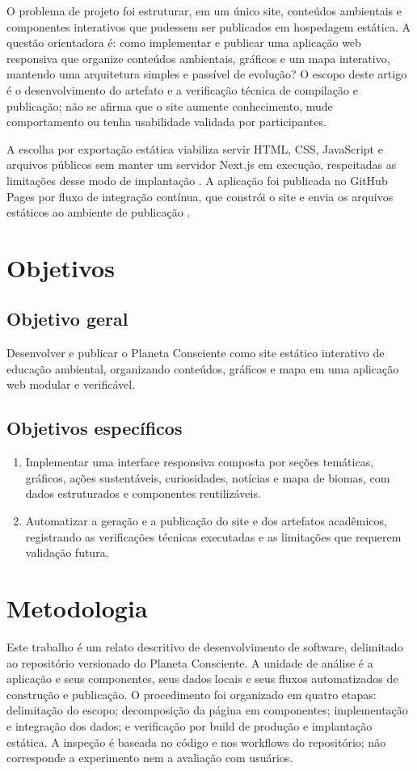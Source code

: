 \documentclass[12pt,oneside,a4paper,brazil]{abntex2}
\begin{document}
O problema de projeto foi estruturar, em um único site, conteúdos ambientais e componentes interativos que pudessem ser publicados em hospedagem estática. A questão orientadora é: como implementar e publicar uma aplicação web responsiva que organize conteúdos ambientais, gráficos e um mapa interativo, mantendo uma arquitetura simples e passível de evolução? O escopo deste artigo é o desenvolvimento do artefato e a verificação técnica de compilação e publicação; não se afirma que o site aumente conhecimento, mude comportamento ou tenha usabilidade validada por participantes.

A escolha por exportação estática viabiliza servir HTML, CSS, JavaScript e arquivos públicos sem manter um servidor Next.js em execução, respeitadas as limitações desse modo de implantação \cite{nextstatic}. A aplicação foi publicada no GitHub Pages por fluxo de integração contínua, que constrói o site e envia os arquivos estáticos ao ambiente de publicação \cite{ghpages}.


\chapter{Objetivos}
\section{Objetivo geral}
Desenvolver e publicar o Planeta Consciente como site estático interativo de educação ambiental, organizando conteúdos, gráficos e mapa em uma aplicação web modular e verificável.

\section{Objetivos específicos}
\begin{enumerate}[leftmargin=1.25cm]
\item Implementar uma interface responsiva composta por seções temáticas, gráficos, ações sustentáveis, curiosidades, notícias e mapa de biomas, com dados estruturados e componentes reutilizáveis.
\item Automatizar a geração e a publicação do site e dos artefatos acadêmicos, registrando as verificações técnicas executadas e as limitações que requerem validação futura.
\end{enumerate}


\chapter{Metodologia}
Este trabalho é um relato descritivo de desenvolvimento de software, delimitado ao repositório versionado do Planeta Consciente. A unidade de análise é a aplicação e seus componentes, seus dados locais e seus fluxos automatizados de construção e publicação. O procedimento foi organizado em quatro etapas: delimitação do escopo; decomposição da página em componentes; implementação e integração dos dados; e verificação por build de produção e implantação estática. A inspeção é baseada no código e nos workflows do repositório; não corresponde a experimento nem a avaliação com usuários.
\end{document}
